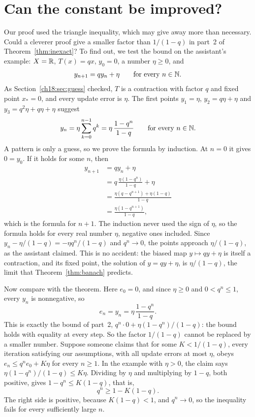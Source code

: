 \section{Can the constant be improved?}\label{ch18:sec:sharp}
Our proof used the triangle inequality, which may give away more than necessary. Could a cleverer proof give a smaller factor than $1/(1-q)$ in part~2 of Theorem~\ref{thm:inexact}? To find out, we test the bound on the assistant's example: $X=\mathbb R$, $T(x)=qx$, $y_0=0$, a number $\eta\ge0$, and
\[
 y_{n+1}=qy_n+\eta\qquad\text{for every }n\in\mathbb N.
\]
As Section~\ref{ch18:sec:guess} checked, $T$ is a contraction with factor $q$ and fixed point $x_*=0$, and every update error is $\eta$. The first points $y_1=\eta$, $y_2=q\eta+\eta$ and $y_3=q^2\eta+q\eta+\eta$ suggest
\[
 y_n=\eta\sum_{k=0}^{n-1}q^k
     =\eta\,\frac{1-q^n}{1-q}\qquad\text{for every }n\in\mathbb N.
\]
A pattern is only a guess, so we prove the formula by induction. At $n=0$ it gives $0=y_0$. If it holds for some $n$, then
\begin{align*}
 y_{n+1}
 &=qy_n+\eta\\
 &=q\,\frac{\eta(1-q^n)}{1-q}+\eta\\
 &=\frac{\eta(q-q^{n+1})+\eta(1-q)}{1-q}\\
 &=\frac{\eta(1-q^{n+1})}{1-q},
\end{align*}
which is the formula for $n+1$. The induction never used the sign of $\eta$, so the formula holds for every real number $\eta$, negative ones included. Since $y_n-\eta/(1-q)=-\eta q^n/(1-q)$ and $q^n\to0$, the points approach $\eta/(1-q)$, as the assistant claimed. This is no accident: the biased map $y\mapsto qy+\eta$ is itself a contraction, and its fixed point, the solution of $y=qy+\eta$, is $\eta/(1-q)$, the limit that Theorem~\ref{thm:banach} predicts.

Now compare with the theorem. Here $e_0=0$, and since $\eta\ge0$ and $0<q^n\le1$, every $y_n$ is nonnegative, so
\[
 e_n=y_n=\eta\,\frac{1-q^n}{1-q}.
\]
This is exactly the bound of part~2, $q^n\cdot0+\eta(1-q^n)/(1-q)$: the bound holds with equality at every step. So the factor $1/(1-q)$ cannot be replaced by a smaller number. Suppose someone claims that for some $K<1/(1-q)$, every iteration satisfying our assumptions, with all update errors at most $\eta$, obeys $e_n\le q^ne_0+K\eta$ for every $n\ge1$. In the example with $\eta>0$, the claim says $\eta(1-q^n)/(1-q)\le K\eta$. Dividing by $\eta$ and multiplying by $1-q$, both positive, gives $1-q^n\le K(1-q)$, that is,
\[
 q^n\ge1-K(1-q).
\]
The right side is positive, because $K(1-q)<1$, and $q^n\to0$, so the inequality fails for every sufficiently large $n$.

